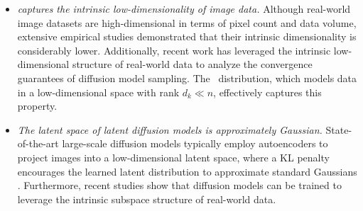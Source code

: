 \begin{itemize}[leftmargin=*]
    \vspace{-0.1in}
    \item \emph{\MoLRG\;captures the intrinsic low-dimensionality of image data.} Although real-world image datasets are high-dimensional in terms of pixel count and data volume, extensive empirical studies \citep{gong2019intrinsic,pope2021intrinsic,stanczuk2022your} demonstrated that their intrinsic dimensionality is considerably lower. Additionally, recent work \citep{huang2024denoising,liang2024low} has leveraged the intrinsic low-dimensional structure of real-world data to analyze the convergence guarantees of diffusion model sampling. The \MoLRG~distribution, which models data in a low-dimensional space with rank $d_k \ll n$, effectively captures this property.
    \item \emph{The latent space of latent diffusion models is approximately Gaussian.} State-of-the-art large-scale diffusion models \citep{peebles2023scalable, podell2023sdxl} typically employ autoencoders \citep{kingma2013auto} to project images into a low-dimensional latent space, where a KL penalty encourages the learned latent distribution to approximate standard Gaussians \citep{rombach2022high}. Furthermore, recent studies \citep{jing2022subspace, chen2024deconstructing} show that diffusion models can be trained to leverage the intrinsic subspace structure of real-world data.
    

\end{itemize}

